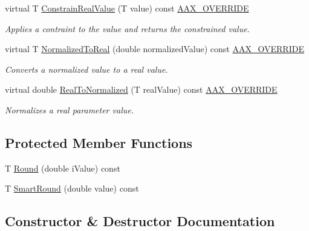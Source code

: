 \begin{DoxyCompactItemize}
virtual T \hyperlink{a00038_aecea5b86d9f5c6a5b1af87ba04d8473d}{Constrain\+Real\+Value} (T value) const \hyperlink{a00149_ac2f24a5172689ae684344abdcce55463}{A\+A\+X\+\_\+\+O\+V\+E\+R\+R\+I\+D\+E}
\begin{DoxyCompactList}\small\item\em Applies a contraint to the value and returns the constrained value. \end{DoxyCompactList}\item 
virtual T \hyperlink{a00038_a50b58efa795c9973ab199d4f5bb31de4}{Normalized\+To\+Real} (double normalized\+Value) const \hyperlink{a00149_ac2f24a5172689ae684344abdcce55463}{A\+A\+X\+\_\+\+O\+V\+E\+R\+R\+I\+D\+E}
\begin{DoxyCompactList}\small\item\em Converts a normalized value to a real value. \end{DoxyCompactList}\item 
virtual double \hyperlink{a00038_a457a42ac3e78debf4c595ac1afeec7cf}{Real\+To\+Normalized} (T real\+Value) const \hyperlink{a00149_ac2f24a5172689ae684344abdcce55463}{A\+A\+X\+\_\+\+O\+V\+E\+R\+R\+I\+D\+E}
\begin{DoxyCompactList}\small\item\em Normalizes a real parameter value. \end{DoxyCompactList}\end{DoxyCompactItemize}
\subsection*{Protected Member Functions}
\begin{DoxyCompactItemize}
\item 
T \hyperlink{a00038_a39835e10149386d650e697699bd4e5fe}{Round} (double i\+Value) const 
\item 
T \hyperlink{a00038_aa8ae9b08205ddb6a92bd62c710ad5d01}{Smart\+Round} (double value) const 
\end{DoxyCompactItemize}


\subsection{Constructor \& Destructor Documentation}
\hypertarget{a00038_a06236d6426f76ff4f7a1d51e9dec5b8c}{}

